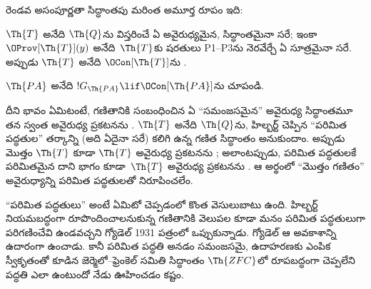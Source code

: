 \documentclass[../../../include/open-logic-section]{subfiles}
\begin{document}
రెండవ అసంపూర్ణతా సిద్ధాంతపు మరింత అమూర్త రూపం ఇది:

\begin{thm}
 $\Th{T}$ అనేది $\Th{Q}$ను విస్తరించే
ఏ అవైరుధ్యమైన,  సిద్ధాంతమైనా సరే; ఇంకా
$\OProv[\Th{T}](y)$ అనేది~$\Th{T}$కు  షరతులు P1--P3ను
నెరవేర్చే ఏ సూత్రమైనా సరే. అప్పుడు $\Th{T}$ అనేది
$\OCon[\Th{T}]$ను .
\end{thm}

\begin{prob}
$\Th{PA}$ అనేది $!G_{\Th{PA}} \lif \OCon[\Th{PA}]$ను
 చూపండి.
\end{prob}

\begin{digress}
దీని భావం ఏమిటంటే, గణితానికి సంబంధించిన ఏ ``సమంజసమైన'' అవైరుధ్య
సిద్ధాంతమూ తన స్వంత అవైరుధ్య ప్రకటనను . $\Th{T}$ అనేది
$\Th{Q}$ను, హిల్బర్ట్ చెప్పిన ``పరిమిత పద్ధతుల'' తర్కాన్ని (అది ఏదైనా సరే)
కలిగి ఉన్న గణిత సిద్ధాంతం అనుకుందాం. అప్పుడు మొత్తం $\Th{T}$ కూడా $\Th{T}$
అవైరుధ్య ప్రకటనను ; అలాంటప్పుడు, పరిమిత పద్ధతులకే పరిమితమైన దాని భాగం కూడా~$\Th{T}$ అవైరుధ్య ప్రకటనను . ఆ అర్థంలో
``మొత్తం గణితం'' అవైరుధ్యాన్ని పరిమిత పద్ధతులతో నిరూపించలేం.

``పరిమిత పద్ధతులు'' అంటే ఏమిటో చెప్పడంలో కొంత వెసులుబాటు ఉంది. హిల్బర్ట్
నియమబద్ధంగా రూపొందించాలనుకున్న గణితానికి వెలుపల కూడా మనం పరిమిత
పద్ధతులుగా పరిగణించేవి ఉండవచ్చని గ్యోడెల్ 1931 పత్రంలో ఒప్పుకున్నాడు.
గ్యోడెల్ ఆ అవకాశాన్ని ఉదారంగా ఉంచాడు. కానీ పరిమిత పద్ధతి అనడం సమంజసమై,
ఉదాహరణకు ఎంపిక స్వీకృతంతో కూడిన జెర్మెలో--ఫ్రెంకెల్ సమితి సిద్ధాంతం
$\Th{ZFC}$లో రూపబద్ధంగా చెప్పలేని పద్ధతి ఎలా ఉంటుందో నేడు ఊహించడం
కష్టం.
\end{digress}
\end{document}
